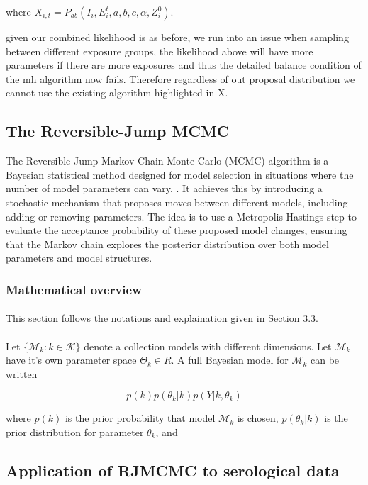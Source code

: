 \documentclass{article}
\begin{document}
where $X_{i,t} =P_{ab}( I_i,  E_i^t, a, b, c, \alpha, Z^0_i) $.

given our combined likelihood is as before, we run into an issue when sampling between different exposure groups, the likelihood above will have more parameters if there are more exposures and thus the detailed balance condition of the mh algorithm now fails. Therefore regardless of out proposal distribution we cannot use the existing algorithm highlighted in X. 


\subsection{The Reversible-Jump MCMC}
The Reversible Jump Markov Chain Monte Carlo (MCMC) algorithm is a Bayesian statistical method designed for model selection in situations where the number of model parameters can vary. . It achieves this by introducing a stochastic mechanism that proposes moves between different models, including adding or removing parameters. The idea is to use a Metropolis-Hastings step to evaluate the acceptance probability of these proposed model changes, ensuring that the Markov chain explores the posterior distribution over both model parameters and model structures.  

\subsubsection{Mathematical overview}
\paragraph{}This section follows the notations and explaination given in Section 3.3. 
\paragraph{}Let $\{\mathcal{M}_k: k \in \mathcal{K}\}$ denote a collection models with different dimensions. Let $\mathcal{M}_k$ have it's own parameter space $\Theta_k \in R$. A full Bayesian model for $\mathcal{M}_k$ can be written 

$$p(k)p(\theta_k|k)p(Y| k, \theta_k) $$

where $p(k)$ is the prior probability that model $\mathcal{M}_k$ is chosen, $p(\theta_k|k)$ is the prior distribution for parameter $\theta_k$, and 

\subsection{Application of RJMCMC to serological data}
\end{document}

